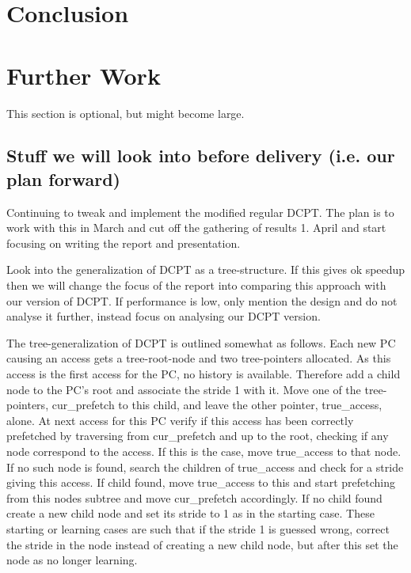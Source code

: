 \documentclass[12pt,journal,compsoc]{IEEEtran}
\begin{document}
\section{Conclusion}

\section{Further Work}
This section is optional, but might become large.

\subsection{Stuff we will look into before delivery (i.e. our plan forward)}
Continuing to tweak and implement the modified regular DCPT. The plan is
to work with this in March and cut off the gathering of results 1. April
and start focusing on writing the report and presentation.

Look into the generalization of DCPT as a tree-structure. If this gives
ok speedup then we will change the focus of the report into comparing this
approach with our version of DCPT. If performance is low, only mention the
design and do not analyse it further, instead focus on analysing our
DCPT version.

The tree-generalization of DCPT is outlined somewhat as follows. Each new PC
causing an access gets a tree-root-node and two tree-pointers allocated.
As this access is the first access for the PC, no history is available.
Therefore add a child node to the PC's root and associate the stride 1 with it.
Move one of the tree-pointers, cur\_prefetch to this child, and leave the other
pointer, true\_access, alone. At next access for this PC verify if this access
has been correctly prefetched by traversing from cur\_prefetch and up to the
root, checking if any node correspond to the access. If this is the case,
move true\_access to that node. If no such node is found, search the children
of true\_access and check for a stride giving this access. If child found, move
true\_access to this and start prefetching from this nodes subtree and move
cur\_prefetch accordingly. If no child found create a new child node and set
its stride to 1 as in the starting case. These starting or learning cases
are such that if the stride 1 is guessed wrong, correct the stride in the node
instead of creating a new child node, but after this set the node as no longer
learning.

\ifCLASSOPTIONcompsoc
\else
\fi
\end{document}
